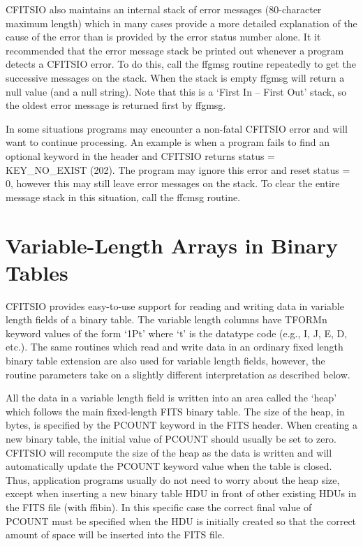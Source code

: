 CFITSIO also maintains an internal stack of error messages
(80-character maximum length)  which in many cases provide a more
detailed explanation of the cause of the error than is provided by the
error status number alone.  It it recommended that the error message
stack be printed out whenever a program detects a CFITSIO error.  To do
this, call the ffgmsg routine repeatedly to get the successive messages
on the stack.  When the stack is empty ffgmsg will return a null value
(and a null string).  Note that this is a `First In -- First Out'
stack, so the oldest error message is returned first by ffgmsg.

In some situations programs may encounter a non-fatal CFITSIO error and
will want to continue processing.  An example is when a program fails
to find an optional keyword in the header and CFITSIO returns status =
KEY\_NO\_EXIST (202).  The program may ignore this error and reset
status = 0, however this may still leave error messages on the stack.
To clear the entire message stack in this situation, call the ffcmsg
routine.


\section{Variable-Length Arrays in Binary Tables}

CFITSIO provides easy-to-use support for reading and writing data in
variable length fields of a binary table. The variable length columns
have TFORMn keyword values of the form `1Pt' where `t' is the datatype
code (e.g., I, J, E, D, etc.). The same routines which read and write
data in an ordinary fixed length binary table extension are also used
for variable length fields, however, the routine parameters take on a
slightly different interpretation as described below.

All the data in a variable length field is written into an area called
the `heap' which follows the main fixed-length FITS binary table. The
size of the heap, in bytes, is specified by the PCOUNT keyword in the
FITS header. When creating a new binary table, the initial value of
PCOUNT should usually be set to zero. CFITSIO will recompute the size of
the heap as the data is written and will automatically update the PCOUNT
keyword value when the table is closed. Thus, application programs
usually do not need to worry about the heap size, except when inserting
a new binary table HDU in front of other existing HDUs in the FITS file
(with ffibin). In this specific case the correct final value of PCOUNT
must be specified when the HDU is initially created so that the correct
amount of space will be inserted into the FITS file.

